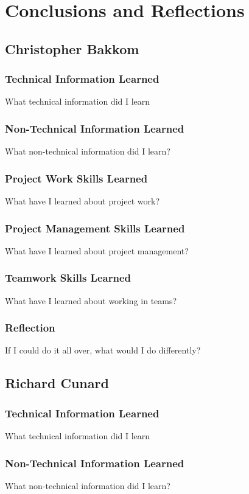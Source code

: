 \documentclass[onecolumn, draftclsnofoot,10pt, compsoc]{IEEEtran}
\begin{document}
\section{Conclusions and Reflections}


\subsection{Christopher Bakkom}

\subsubsection{Technical Information Learned}
What technical information did I learn
\subsubsection{Non-Technical Information Learned}
What non-technical information did I learn?
\subsubsection{Project Work Skills Learned}
What have I learned about project work?
\subsubsection{Project Management Skills Learned}
What have I learned about project management?
\subsubsection{Teamwork Skills Learned}
What have I learned about working in teams?
\subsubsection{Reflection}
If I could do it all over, what would I do differently?


\subsection{Richard Cunard}

\subsubsection{Technical Information Learned}
What technical information did I learn
\subsubsection{Non-Technical Information Learned}
What non-technical information did I learn?
\end{document}
